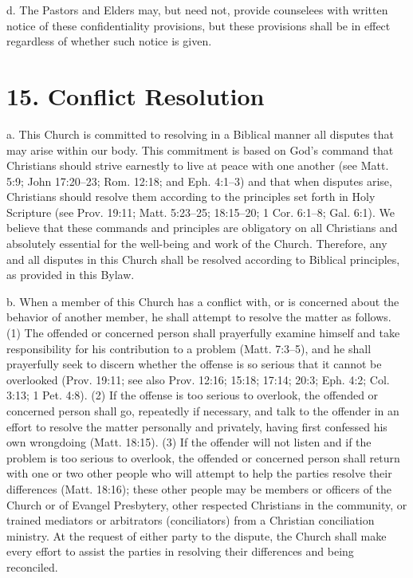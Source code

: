 \documentclass[
]{book}
\begin{document}
d. The Pastors and Elders may, but need not, provide counselees with written notice of these confidentiality provisions, but these provisions shall be in effect regardless of whether such notice is given.

\hypertarget{conflict-resolution}{%
\section{15. Conflict Resolution}\label{conflict-resolution}}

a. This Church is committed to resolving in a Biblical manner all disputes that may arise within our body. This commitment is based on God's command that Christians should strive earnest­ly to live at peace with one another (see Matt. 5:9; John 17:20--23; Rom. 12:18; and Eph. 4:1--3) and that when disputes arise, Christians should resolve them according to the principles set forth in Holy Scripture (see Prov. 19:11; Matt. 5:23--25; 18:15--20; 1 Cor. 6:1--8; Gal. 6:1). We believe that these commands and principles are obligatory on all Christians and absolutely essential for the well-being and work of the Church. Therefore, any and all dis­putes in this Church shall be resolved according to Biblical principles, as provided in this Bylaw.

b. When a member of this Church has a conflict with, or is concerned about the behavior of another member, he shall attempt to resolve the matter as follows. (1) The offended or con­cerned person shall prayerfully examine himself and take responsibility for his contribution to a problem (Matt. 7:3--5), and he shall prayerfully seek to discern whether the offense is so serious that it cannot be overlooked (Prov. 19:11; see also Prov. 12:16; 15:18; 17:14; 20:3; Eph. 4:2; Col. 3:13; 1 Pet. 4:8). (2) If the offense is too serious to overlook, the offended or concerned person shall go, repeatedly if necessary, and talk to the offender in an effort to resolve the matter personally and privately, having first confessed his own wrongdoing (Matt. 18:15). (3) If the offender will not listen and if the problem is too serious to overlook, the offended or concerned person shall return with one or two other people who will attempt to help the parties resolve their differences (Matt. 18:16); these other people may be members or officers of the Church or of Evangel Presbytery, other respected Christians in the community, or trained mediators or arbitrators (conciliators) from a Christian concilia­tion ministry. At the request of either party to the dispute, the Church shall make every effort to assist the parties in resolving their differences and being reconciled.
\end{document}
